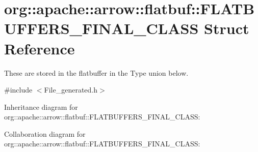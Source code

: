 \hypertarget{structorg_1_1apache_1_1arrow_1_1flatbuf_1_1FLATBUFFERS__FINAL__CLASS}{}\section{org\+:\+:apache\+:\+:arrow\+:\+:flatbuf\+:\+:F\+L\+A\+T\+B\+U\+F\+F\+E\+R\+S\+\_\+\+F\+I\+N\+A\+L\+\_\+\+C\+L\+A\+SS Struct Reference}
\label{structorg_1_1apache_1_1arrow_1_1flatbuf_1_1FLATBUFFERS__FINAL__CLASS}


These are stored in the flatbuffer in the Type union below.  




{\ttfamily \#include $<$File\+\_\+generated.\+h$>$}



Inheritance diagram for org\+:\+:apache\+:\+:arrow\+:\+:flatbuf\+:\+:F\+L\+A\+T\+B\+U\+F\+F\+E\+R\+S\+\_\+\+F\+I\+N\+A\+L\+\_\+\+C\+L\+A\+SS\+:


Collaboration diagram for org\+:\+:apache\+:\+:arrow\+:\+:flatbuf\+:\+:F\+L\+A\+T\+B\+U\+F\+F\+E\+R\+S\+\_\+\+F\+I\+N\+A\+L\+\_\+\+C\+L\+A\+SS\+:
